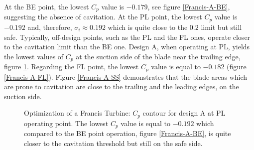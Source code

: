 At the BE point, the lowest $C_p$ value is $-0.179$, see figure \ref{Francis-A-BE}, suggesting the absence of cavitation.
At the PL point, the lowest $C_p$ value is $-0.192$ and, therefore, $\sigma_i \approx 0.192$ which is quite close to the $0.2$ limit but still safe. Typically, off-design points, such as the PL and the FL ones, operate closer to the cavitation limit than the BE one. Design A, when operating at PL, yields the lowest values of $C_p$ at the suction side of the blade near the trailing edge, figure \ref{Francis-A-PL}.  
Regarding the FL point, the lowest  $C_p$ value is equal to $-0.182$ (figure \ref{Francis-A-FL}). Figure \ref{Francis-A-SS} demonstrates that the blade areas which are prone to cavitation are close to the trailing and the leading edges, on the suction side. 

 
\begin{figure}[h!]
\begin{minipage}[b]{1\linewidth}
 \centering
\end{minipage}
\caption{Optimization of a Francis Turbine: $C_p$ contour for design A at PL operating point. The lowest $C_p$ value is equal to $-0.192$ which compared to the BE point operation, figure \ref{Francis-A-BE}, is quite closer to the cavitation threshold but still on the safe side.}
\label{Francis-A-PL}
\end{figure}


